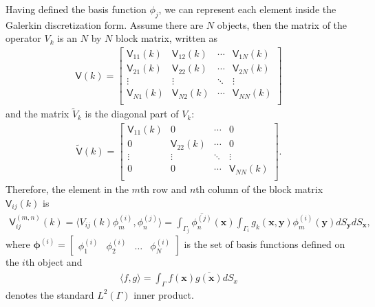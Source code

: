 Having defined the basis function $\phi_j$, we can represent each element inside the Galerkin discretization form. Assume there are $N$ objects,
then the matrix of the operator $V_k$ is an $N$ by $N$ block matrix, written as 
\begin{align}\label{matrix V}
    \mathsf{V}(k) = \begin{bmatrix}
        \mathsf{V}_{11}(k) & \mathsf{V}_{12}(k) & \cdots & \mathsf{V}_{1N}(k) \\
        \mathsf{V}_{21}(k) & \mathsf{V}_{22}(k) & \cdots & \mathsf{V}_{2N}(k) \\
        \vdots & \vdots & \ddots & \vdots \\
        \mathsf{V}_{N1}(k) & \mathsf{V}_{N2}(k) & \cdots & \mathsf{V}_{NN}(k) \\
\end{bmatrix}
\end{align}
and the matrix $\tilde{V}_{k}$ is the diagonal part of $V_{k}$:
\begin{align}\label{matrix tilde V}
    \tilde{\mathsf{V}}(k) = \begin{bmatrix}
        \mathsf{V}_{11}(k) & 0      & \cdots & 0 \\
    0      & \mathsf{V}_{22}(k) & \cdots & 0\\
    \vdots & \vdots & \ddots & \vdots \\
    0      & 0      & \cdots & \mathsf{V}_{NN}(k) \\
\end{bmatrix}.
\end{align}
Therefore, the element in the $m$th row and $n$th column of the block matrix $\mathsf{V}_{ij}(k)$ is 
\begin{align}\label{Elements in matrix V}
    \mathsf{V}_{ij}^{(m,n)} (k) = \langle V_{ij}(k)\phi_{m}^{(i)}, \phi_{n}^{(j)}\rangle = 
    \int_{\Gamma_{j}}\overline{\phi_{n}^{(j)}}(\boldsymbol{x})\int_{\Gamma_{i}}g_{k}(\boldsymbol{x}, \boldsymbol{y})\phi_{m}^{(i)}(\boldsymbol{y})dS_{\boldsymbol{y}}dS_{\boldsymbol{x}},
\end{align}
where $\boldsymbol{\phi}^{(i)} = \begin{bmatrix}
    \phi_{1}^{(i)} & \phi_{2}^{(i)} & \dots & \phi_{N}^{(i)}
\end{bmatrix}$ is the set of basis functions defined on the $i$th object and 
\begin{align*}
    \langle f, g \rangle = \int_{\Gamma}{f(\boldsymbol{x})}\overline{g(\boldsymbol{x})}dS_{x}
\end{align*}
denotes the standard $L^{2}(\Gamma)$ inner product.



